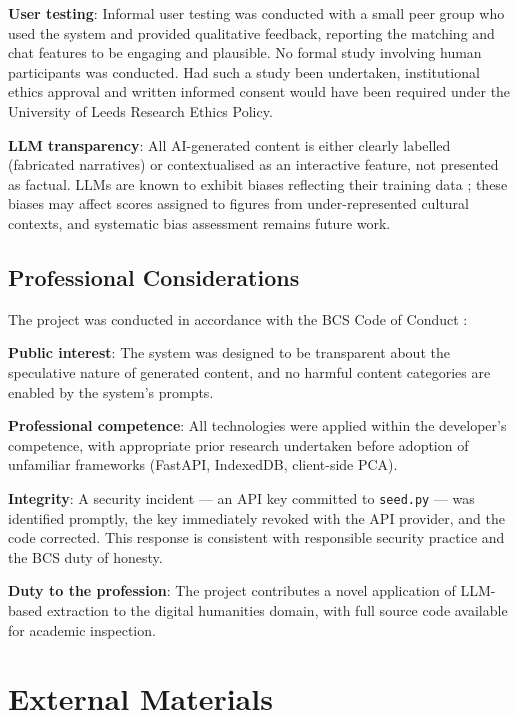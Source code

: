 \documentclass[11pt, a4paper]{report}
\begin{document}
\textbf{User testing}: Informal user testing was conducted with a small peer group who used the system and provided qualitative feedback, reporting the matching and chat features to be engaging and plausible. No formal study involving human participants was conducted. Had such a study been undertaken, institutional ethics approval and written informed consent would have been required under the University of Leeds Research Ethics Policy.

\textbf{LLM transparency}: All AI-generated content is either clearly labelled (fabricated narratives) or contextualised as an interactive feature, not presented as factual. LLMs are known to exhibit biases reflecting their training data \citep{bender2021}; these biases may affect scores assigned to figures from under-represented cultural contexts, and systematic bias assessment remains future work.

\section{Professional Considerations}

The project was conducted in accordance with the BCS Code of Conduct \citep{bcs2022}:

\textbf{Public interest}: The system was designed to be transparent about the speculative nature of generated content, and no harmful content categories are enabled by the system's prompts.

\textbf{Professional competence}: All technologies were applied within the developer's competence, with appropriate prior research undertaken before adoption of unfamiliar frameworks (FastAPI, IndexedDB, client-side PCA).

\textbf{Integrity}: A security incident — an API key committed to \texttt{seed.py} — was identified promptly, the key immediately revoked with the API provider, and the code corrected. This response is consistent with responsible security practice and the BCS duty of honesty.

\textbf{Duty to the profession}: The project contributes a novel application of LLM-based extraction to the digital humanities domain, with full source code available for academic inspection.

\chapter{External Materials}
\end{document}
